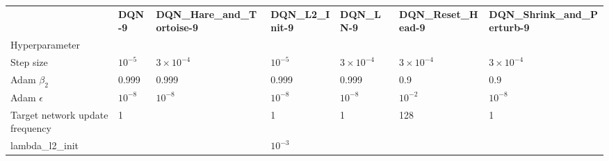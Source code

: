 \begin{tabular}{lllllll}
 & \bfseries DQN-9 & \bfseries DQN_Hare_and_Tortoise-9 & \bfseries DQN_L2_Init-9 & \bfseries DQN_LN-9 & \bfseries DQN_Reset_Head-9 & \bfseries DQN_Shrink_and_Perturb-9 \\
Hyperparameter &  &  &  &  &  &  \\
Step size & $10^{-5}$ & $3 \times 10^{-4}$ & $10^{-5}$ & $3 \times 10^{-4}$ & $3 \times 10^{-4}$ & $3 \times 10^{-4}$ \\
Adam $\beta_2$ & 0.999 & 0.999 & 0.999 & 0.999 & 0.9 & 0.9 \\
Adam $\epsilon$ & $10^{-8}$ & $10^{-8}$ & $10^{-8}$ & $10^{-8}$ & $10^{-2}$ & $10^{-8}$ \\
Target network update frequency & 1 &  & 1 & 1 & 128 & 1 \\
lambda_l2_init &  &  & $10^{-3}$ &  &  &  \\
\end{tabular}
